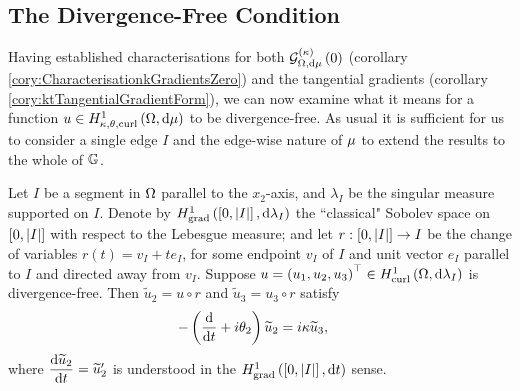 \subsection{The Divergence-Free Condition} \label{sec:ktDivFree}
Having established characterisations for both $\mathcal{G}_{ \Omega, \mathrm{d}\mu}^{(\kappa)}\left( 0 \right)$ (corollary \ref{cory:CharacterisationkGradientsZero}) and the tangential gradients (corollary \ref{cory:ktTangentialGradientForm}), we can now examine what it means for a function $u\in H^1_{\kappa,\theta,\mathrm{curl}}\left( \Omega, \mathrm{d}\mu \right)$ to be divergence-free.
As usual it is sufficient for us to consider a single edge $I$ and the edge-wise nature of $\mu$ to extend the results to the whole of $\mathbb{G}$.
\begin{lemma} \label{lem:DivFreeParallelSegment}
	Let $I$ be a segment in $\Omega$ parallel to the $x_2$-axis, and $\lambda_I$ be the singular measure supported on $I$.
	Denote by $H^1_\mathrm{grad}\left( \left[ 0,\left\lvert I \right\rvert \right], \mathrm{d}\lambda_I \right)$ the ``classical" Sobolev space on $\left[ 0,\left\lvert I \right\rvert \right]$ with respect to the Lebesgue measure; and let $r:\left[ 0,\left\lvert I \right\rvert \right]\rightarrow I$ be the change of variables $r(t)= v_I + t e_I$, for some endpoint $v_I$ of $I$ and unit vector $e_I$ parallel to $I$ and directed away from $v_I$.
	Suppose $u=\left( u_1, u_2, u_3 \right)^\top\in H^1_\mathrm{curl}\left( \Omega, \mathrm{d}\lambda_I \right)$ is divergence-free.
	Then $\widetilde{u}_2 = u \circ r$ and $\widetilde{u}_3 = u_3 \circ r$ satisfy
	\begin{align*}
		-\left( \dfrac{\mathrm{d}}{\mathrm{d}t} + i\theta_2 \right)\widetilde{u}_2 &= i\kappa\widetilde{u}_3,
	\end{align*}
	where $\dfrac{\mathrm{d}\widetilde{u}_2}{\mathrm{d}t} = \widetilde{u}'_2$ is understood in the $H^1_\mathrm{grad}\left( \left[ 0,\left\lvert I \right\rvert \right], \mathrm{d}t \right)$ sense.
\end{lemma}
